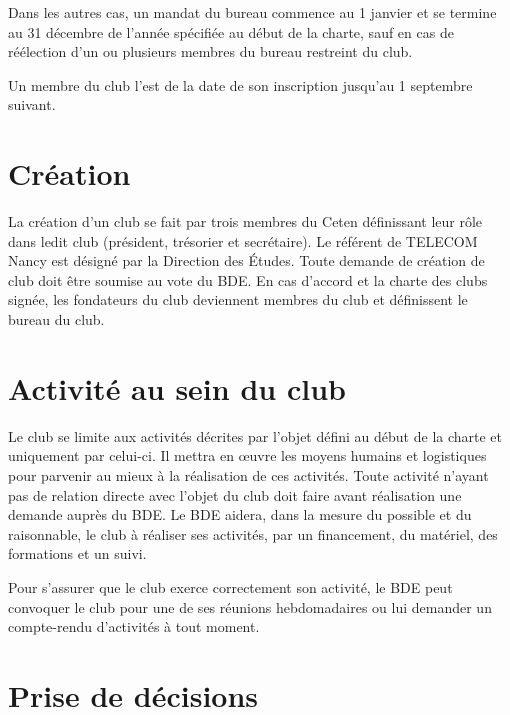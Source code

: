 \documentclass{article}
\begin{document}
\begin{multicols}{2}
{			Dans les autres cas, un mandat du bureau commence au 1
			janvier et se termine au 31 décembre de l'année spécifiée au début
			de la charte, sauf en cas de réélection d'un ou plusieurs membres du
			bureau restreint du club.

			Un membre du club l'est de la date de son inscription jusqu'au
			1 septembre suivant.

		}

		\section{Création}
\label{sec:creation}
		
		{\small
		
			La création d’un club se fait par trois membres du Ceten définissant
			leur rôle dans ledit club (président, trésorier et secrétaire). Le
			référent de TELECOM Nancy est désigné par la Direction des Études.
			Toute demande de création de club doit être soumise au vote du BDE\@.
			En cas d’accord et la charte des clubs signée, les fondateurs du
			club deviennent membres du club et définissent le bureau du club.
			
		}

		\section{Activité au sein du club}
\label{sec:activite_au_sein_du_club}
		
		{\small
		
			Le club se limite aux activités décrites par l’objet défini au début
			de la charte et uniquement par celui-ci. Il mettra en œuvre les
			moyens humains et logistiques pour parvenir au mieux à la
			réalisation de ces activités. Toute activité n’ayant pas de relation
			directe avec l’objet du club doit faire avant réalisation une
			demande auprès du BDE\@. Le BDE aidera, dans la mesure du possible et
			du raisonnable, le club à réaliser ses activités, par un 
			financement, du matériel, des formations et un suivi.

			Pour s’assurer que le club exerce correctement son activité, le BDE
			peut convoquer le club pour une de ses réunions hebdomadaires ou lui
			demander un compte-rendu d’activités à tout moment.
			
		}

		\section{Prise de décisions}
\label{sec:prise_de_decisions}
		

\end{multicols}
\end{document}
